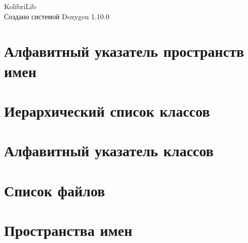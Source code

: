 \documentclass[twoside]{book}
\newcommand{\+}{\discretionary{\mbox{\scriptsize$\hookleftarrow$}}{}{}}
\newcommand{\clearemptydoublepage}{%
    \newpage{\pagestyle{empty}\cleardoublepage}%
  }
\begin{document}
  \raggedbottom
    \hypersetup{pageanchor=false,
                bookmarksnumbered=true,
                pdfencoding=unicode
               }
  \begin{titlepage}
  \vspace*{7cm}
  \begin{center}%
  {\Large Kolibri\+Lib}\\
  \vspace*{1cm}
  {\large Создано системой Doxygen 1.10.0}\\
  \end{center}
  \end{titlepage}
  \clearemptydoublepage
  \tableofcontents
  \clearemptydoublepage
  \hypersetup{pageanchor=true}




\chapter{Алфавитный указатель пространств имен}

\chapter{Иерархический список классов}

\chapter{Алфавитный указатель классов}

\chapter{Список файлов}

\chapter{Пространства имен}















\end{document}
